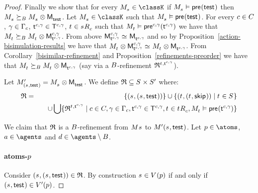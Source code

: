 \begin{proof}
Finally we show that for every $\kPModel{\kStateS} \in \classK$ if $\kPModel{\kStateS} \entails \aPrecondition(\aStateTest)$ then $\kPModel{\kStateS} \simulatesBs \kPModel{\kStateS} \exec \aPModel{\aStateTest}$.
Let $\kPModel{\kStateS} \in \classK$ such that $\kPModel{\kStateS} \entails \aPrecondition(\aStateTest)$.
For every $\agentC \in \agentsC$, $\gamma \in \Gamma_\agentC$, $\aStateT[\agentC, \gamma] \in \aStatesT[\agentC, \gamma]$, $\kStateT \in \kSuccessorsC{\kStateS}$ such that $\kPModel{\kStateT} \entails \aPrecondition[\agentC,\gamma](\aStateT[\agentC,\gamma])$ we have that $\kPModel{\kStateT} \simulatesBs \kPModel{\kStateT} \exec \aPModel[\agentC, \gamma]{\aStateT[\agentC, \gamma]}$.
From above $\aPModel[\agentC, \gamma]{\aStateT[\agentC, \gamma]} \bisimilar \aPModel{\aStateT[\agentC, \gamma]}$ and so by 
Proposition~\ref{action-bisimulation-results} we have that $\kPModel{\kStateT} \exec \aPModel[\agentC, \gamma]{\aStateT[\agentC, \gamma]} \bisimilar \kPModel{\kStateT} \exec \aPModel{\aStateT[\agentC, \gamma]}$.
From Corollary~\ref{bisimilar-refinement} and Proposition~\ref{refinements-preorder} we have that $\kPModel{\kStateT} \simulatesBs \kPModel{\kStateT} \exec \aPModel{\aStateT[\agentC, \gamma]}$ (say via a $\agentsB$-refinement $\refinement^{\kStateT, \aStateT[\agentC, \gamma]}$).

Let $\kPModelP{(\kStateS, \aStateTest)} = \kPModel{\kStateS} \exec \aPModel{\aStateTest}$.
We define $\refinement \subseteq \kStates \times \kStatesP$ where:
\begin{eqnarray*}
\refinement &=& 
\{(\kStateS, (\kStateS, \aStateTest))\} \cup 
\{(\kStateT, (\kStateT, \aStateSkip)) \mid \kStateT \in \kStates\}  \\&&\quad \cup
\bigcup \{\refinement^{\kStateT, \aStateT[\agentC, \gamma]} \mid \agentC \in \agentsC, \gamma \in \Gamma_\agentC, \aStateT[\agentC, \gamma] \in \aStatesT[\agentC, \gamma], \kStateT \in \kSuccessorsC{\kStateT}, \kPModel{\kStateT} \entails \aPrecondition(\aStateT[\agentC, \gamma])\}
\end{eqnarray*}

We claim that $\refinement$ is a $\agentsB$-refinement from $\kModel{\kStateS}$ to $\kModelP{(\kStateS, \aStateTest)}$.
Let $\atomP \in \atoms$, $\agentA \in \agents$ and $\agentD \in \agents \setminus \agentsB$.

\paragraph{atoms-$\atomP$}
Consider $(\kStateS, (\kStateS, \aStateTest)) \in \refinement$.
By construction $\kStateS \in \kValuation(\atomP)$ if and only if $(\kStateS, \aStateTest) \in \kValuationP(\atomP)$.


\end{proof}
